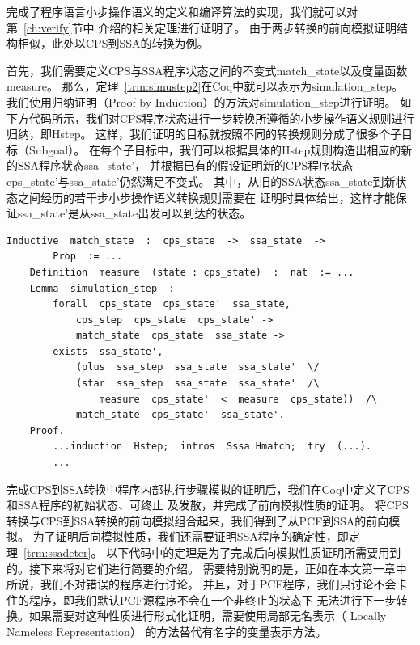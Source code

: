 完成了程序语言小步操作语义的定义和编译算法的实现，我们就可以对第~\ref{ch:verify}节中
介绍的相关定理进行证明了。
由于两步转换的前向模拟证明结构相似，此处以CPS到SSA的转换为例。

首先，我们需要定义CPS与SSA程序状态之间的不变式match\_state以及度量函数measure。
那么，定理~\ref{trm:simustep2}在Coq中就可以表示为simulation\_step。
我们使用归纳证明（Proof by Induction）的方法对simulation\_step进行证明。
如下方代码所示，我们对CPS程序状态进行一步转换所遵循的小步操作语义规则进行归纳，即Hstep。
这样，我们证明的目标就按照不同的转换规则分成了很多个子目标（Subgoal）。
在每个子目标中，我们可以根据具体的Hstep规则构造出相应的新的SSA程序状态ssa\_state'，
并根据已有的假设证明新的CPS程序状态cps\_state'与ssa\_state'仍然满足不变式。
其中，从旧的SSA状态ssa\_state到新状态之间经历的若干步小步操作语义转换规则需要在
证明时具体给出，这样才能保证ssa\_state'是从ssa\_state出发可以到达的状态。

\begin{lstlisting}[language=Coq]  
    Inductive  match_state  :  cps_state  ->  ssa_state  ->  
        Prop  := ...
    Definition  measure  (state : cps_state)  :  nat  := ...
    Lemma  simulation_step  :
        forall  cps_state  cps_state'  ssa_state,
            cps_step  cps_state  cps_state' ->
            match_state  cps_state  ssa_state ->
        exists  ssa_state',  
            (plus  ssa_step  ssa_state  ssa_state'  \/
            (star  ssa_step  ssa_state  ssa_state'  /\  
                measure  cps_state'  <  measure  cps_state))  /\
            match_state  cps_state'  ssa_state'.          
    Proof.
        ...induction  Hstep;  intros  Sssa Hmatch;  try  (...).
        ...
\end{lstlisting}

完成CPS到SSA转换中程序内部执行步骤模拟的证明后，我们在Coq中定义了CPS和SSA程序的初始状态、可终止
及发散，并完成了前向模拟性质的证明。
将CPS转换与CPS到SSA转换的前向模拟组合起来，我们得到了从PCF到SSA的前向模拟。
为了证明后向模拟性质，我们还需要证明SSA程序的确定性，即定理~\ref{trm:ssadeter}。
以下代码中的定理是为了完成后向模拟性质证明所需要用到的。接下来将对它们进行简要的介绍。
需要特别说明的是，正如在本文第一章中所说，我们不对错误的程序进行讨论。
并且，对于PCF程序，我们只讨论不会卡住的程序，即我们默认PCF源程序不会在一个非终止的状态下
无法进行下一步转换。如果需要对这种性质进行形式化证明，需要使用局部无名表示（ Locally Nameless Representation）
的方法替代有名字的变量表示方法。

